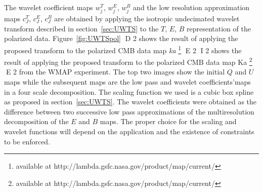 \vspace{.1cm}
The wavelet coefficient maps  $w_j^T$, $w_j^E$, $w_j^B$ and the low resolution approximation maps $c_J^T$, $c_J^E$, $c_J^B$ are obtained by applying 
the isotropic undecimated wavelet transform described in section~\ref{sec:UWTS} to the $T$, $E$, $B$ representation of the polarized data. Figure~\ref{fig:UWTSpol} 
D 2
shows the result of applying the proposed transform to the polarized CMB data map \emph{ka} \footnote{available at http://lambda.gsfc.nasa.gov/product/map/current/ } 
E 2
I 2
shows the result of applying the proposed transform to the polarized CMB data map Ka \footnote{available at http://lambda.gsfc.nasa.gov/product/map/current/ } 
E 2
from the WMAP experiment. The top two images show the initial $Q$ and $U$ maps while the subsequent maps are the low pass and wavelet coefficients'maps 
in a four scale decomposition. The scaling function we used is a cubic box spline as proposed in section~\ref{sec:UWTS}. The wavelet coefficients were 
obtained as the difference between two successive low pass approximations of the multiresolution decomposition of the $E$ and $B$ maps. The proper choice 
for the scaling and wavelet functions will depend on the application and the existence of constraints to be enforced.
